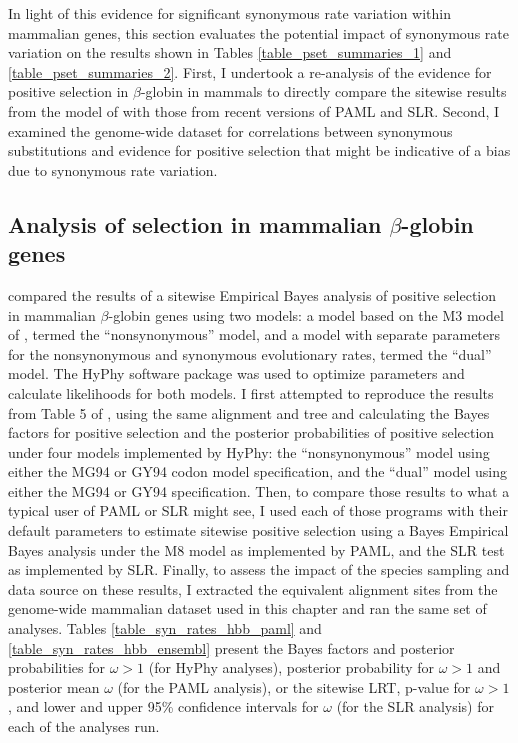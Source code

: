 In light of this evidence for significant synonymous rate variation
within mammalian genes, this section evaluates the potential impact of
synonymous rate variation on the results shown in Tables
\ref{table_pset_summaries_1} and \ref{table_pset_summaries_2}. First,
I undertook a re-analysis of the evidence for positive selection in
$\beta$-globin in mammals to directly compare the sitewise results
from the model of \citet{Pond2005b} with those from recent versions of
PAML and SLR. Second, I examined the genome-wide dataset for
correlations between synonymous substitutions and evidence for
positive selection that might be indicative of a bias due to
synonymous rate variation.

\subsection{Analysis of selection in mammalian $\beta$-globin genes}

\citet{Pond2005b} compared the results of a sitewise Empirical Bayes
analysis of positive selection in mammalian $\beta$-globin genes using
two models: a model based on the M3 model of \citet{Yang2007}, termed
the ``nonsynonymous'' model, and a model with separate parameters for
the nonsynonymous and synonymous evolutionary rates, termed the
``dual'' model. The HyPhy software package \citep{Pond2005} was used
to optimize parameters and calculate likelihoods for both models. I
first attempted to reproduce the results from Table 5 of
\citet{Pond2005b}, using the same alignment and tree and calculating
the Bayes factors for positive selection and the posterior
probabilities of positive selection under four models implemented by
HyPhy: the ``nonsynonymous'' model using either the MG94 or GY94 codon
model specification, and the ``dual'' model using either the MG94 or
GY94 specification. Then, to compare those results to what a typical
user of PAML or SLR might see, I used each of those programs with
their default parameters to estimate sitewise positive selection using
a Bayes Empirical Bayes analysis under the M8 model as implemented by
PAML, and the SLR test as implemented by SLR. Finally, to assess the
impact of the species sampling and data source on these results, I
extracted the equivalent alignment sites from the genome-wide
mammalian dataset used in this chapter and ran the same set of
analyses. Tables \ref{table_syn_rates_hbb_paml} and
\ref{table_syn_rates_hbb_ensembl} present the Bayes factors and
posterior probabilities for $\omega>1$ (for HyPhy analyses), posterior
probability for $\omega>1$ and posterior mean $\omega$ (for the PAML
analysis), or the sitewise LRT, p-value for $\omega>1$, and lower and
upper 95\% confidence intervals for $\omega$ (for the SLR analysis)
for each of the analyses run.


